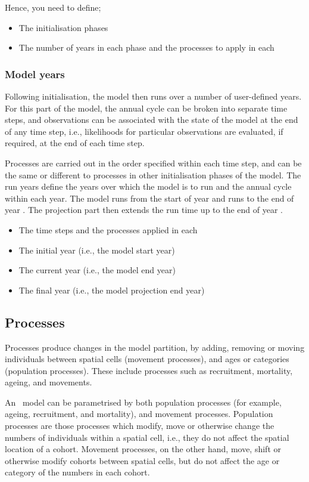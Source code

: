 Hence, you need to define;
\begin{itemize}
  \item The initialisation phases
  \item The number of years in each phase and the processes to apply in each
\end{itemize}

\subsubsection{Model years}

Following initialisation, the model then runs over a number of user-defined years. For this part of the model, the annual cycle can be broken into separate time steps, and observations can be associated with the state of the model at the end of any time step, i.e., likelihoods for particular observations are evaluated, if required, at the end of each time step. 

Processes are carried out in the order specified within each time step, and can be the same or different to processes in other initialisation phases of the model. The run years define the years over which the model is to run and the annual cycle within each year. The model runs from the start of year  and runs to the end of year . The projection part then extends the run time up to the end of year . 

\begin{itemize}
  \item The time steps and the processes applied in each
  \item The initial year (i.e., the model start year)
  \item The current year (i.e., the model end year)
  \item The final year (i.e., the model projection end year)
\end{itemize}

\subsection{Processes}

Processes produce changes in the model partition, by adding, removing or moving individuals between spatial cells (movement processes), and ages or categories (population processes). These include processes such as recruitment, mortality, ageing, and movements.

An \SPM\ model can be parametrised by both population processes (for example, ageing, recruitment, and mortality), and movement processes. Population processes are those processes which modify, move or otherwise change the numbers of individuals within a spatial cell, i.e., they do not affect the spatial location of a cohort. Movement processes, on the other hand, move, shift or otherwise modify cohorts between spatial cells, but do not affect the age or category of the numbers in each cohort. 

